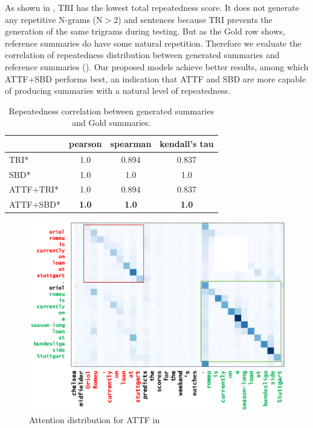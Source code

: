 As shown in , TRI has the lowest total repeatedness score.
It does not generate any repetitive N-grams (N$>$2) and sentences 
because TRI prevents the generation of the same trigrams during testing.
But as the Gold row shows, reference summaries do have some natural repetition.
Therefore we evaluate the correlation of repeatedness distribution between
generated summaries and reference summaries ().
Our proposed models achieve better results, among which ATTF+SBD performs best, an indication that ATTF and SBD are more capable of producing summaries with a natural level of repeatedness.

\begin{table}[th!]
        \centering
        \small
        \begin{tabular}{|l|c|c|c|}
                \hline
                     & pearson  & spearman & kendall's tau \\
                \hline
                TRI* & 1.0 & 0.894 & 0.837  \\
                SBD* & 1.0 & 1.0 & 1.0 \\
                ATTF+TRI* & 1.0 & 0.894 & 0.837 \\
                ATTF+SBD* & \bf 1.0 & \bf 1.0 & \bf 1.0 \\
                \hline
        \end{tabular}
    \caption{Repeatedness correlation between generated summaries and Gold summaries.}
        \label{tab:eval_repcor}
\end{table}

\begin{figure}[th!]
\centering
\includegraphics[width=0.84\columnwidth]{map3}
\caption{Attention distribution for ATTF in }
\label{fig:attn_map3}
\end{figure}
	
